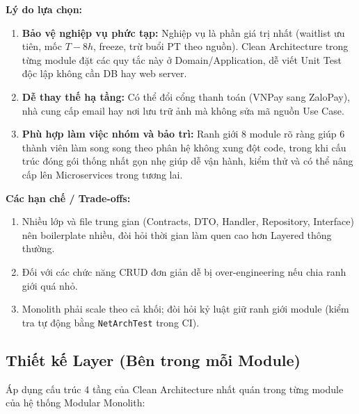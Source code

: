 \documentclass[a4paper,12pt]{article}
\begin{document}
\textbf{Lý do lựa chọn:}
\begin{enumerate}
    \item \textbf{Bảo vệ nghiệp vụ phức tạp:} Nghiệp vụ là phần giá trị nhất (waitlist ưu tiên, mốc $T-8h$, freeze, trừ buổi PT theo nguồn). Clean Architecture trong từng module đặt các quy tắc này ở Domain/Application, dễ viết Unit Test độc lập không cần DB hay web server.
    \item \textbf{Dễ thay thế hạ tầng:} Có thể đổi cổng thanh toán (VNPay sang ZaloPay), nhà cung cấp email hay nơi lưu trữ ảnh mà không sửa mã nguồn Use Case.
    \item \textbf{Phù hợp làm việc nhóm và bảo trì:} Ranh giới 8 module rõ ràng giúp 6 thành viên làm song song theo phân hệ không xung đột code, trong khi cấu trúc đóng gói thống nhất gọn nhẹ giúp dễ vận hành, kiểm thử và có thể nâng cấp lên Microservices trong tương lai.
\end{enumerate}

\textbf{Các hạn chế / Trade-offs:}
\begin{enumerate}
    \item Nhiều lớp và file trung gian (Contracts, DTO, Handler, Repository, Interface) nên boilerplate nhiều, đòi hỏi thời gian làm quen cao hơn Layered thông thường.
    \item Đối với các chức năng CRUD đơn giản dễ bị over-engineering nếu chia ranh giới quá nhỏ.
    \item Monolith phải scale theo cả khối; đòi hỏi kỷ luật giữ ranh giới module (kiểm tra tự động bằng \texttt{NetArchTest} trong CI).
\end{enumerate}

\subsection{Thiết kế Layer (Bên trong mỗi Module)}
Áp dụng cấu trúc 4 tầng của Clean Architecture nhất quán trong từng module của hệ thống Modular Monolith:
\end{document}
